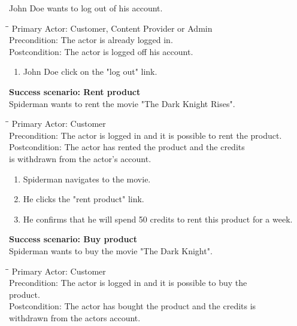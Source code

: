 John Doe wants to log out of his account. 
\begin{tabbing}
\hspace{5mm}\=\hspace{26mm}\=\kill
\>Primary Actor:\> Customer, Content Provider or Admin\\
\>Precondition:\> The actor is already logged in.\\
\>Postcondition:\> The actor is logged off his account.
\end{tabbing}
\begin{enumerate} \setlength{\itemsep}{-1mm}
	\item John Doe click on the "log out" link.
\end{enumerate}
\vspace{3mm}
\textbf{Success scenario: Rent product} \\
Spiderman wants to rent the movie "The Dark Knight Rises". 
\begin{tabbing}
\hspace{5mm}\=\hspace{26mm}\=\kill
\>Primary Actor:\> Customer\\
\>Precondition:\> The actor is logged in and it is possible to rent the product.\\
\>Postcondition:\> The actor has rented the product and the credits\\ \hspace{85px} is withdrawn from the actor's account.
\end{tabbing}
\begin{enumerate} \setlength{\itemsep}{-1mm}
	\item Spiderman navigates to the movie.
	\item He clicks the "rent product" link.
	\item He confirms that he will spend 50 credits to rent this product for a week.
\end{enumerate}
\vspace{3mm}
\textbf{Success scenario: Buy product} \\
Spiderman wants to buy the movie "The Dark Knight". 
\begin{tabbing}
\hspace{5mm}\=\hspace{26mm}\=\kill
\>Primary Actor:\> Customer\\
\>Precondition:\> The actor is logged in and it is possible to buy the\\ \hspace{85px} product.\\
\>Postcondition:\> The actor has bought the product and the credits is\\ \hspace{85px} withdrawn from the actors account.
\end{tabbing}
